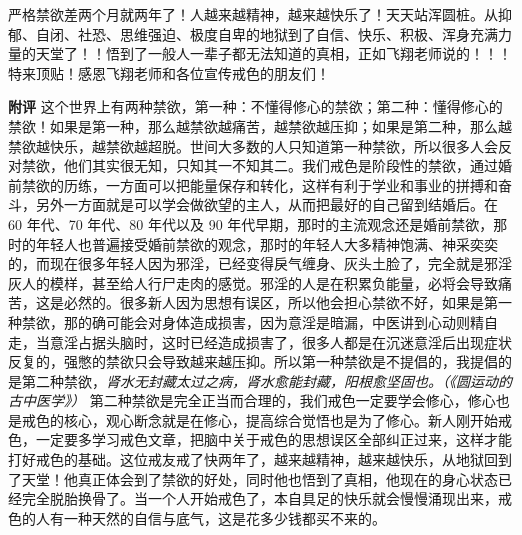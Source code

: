 \begin{case}
    严格禁欲差两个月就两年了！人越来越精神，越来越快乐了！天天站浑圆桩。从抑郁、自闭、社恐、思维强迫、极度自卑的地狱到了自信、快乐、积极、浑身充满力量的天堂了！！悟到了一般人一辈子都无法知道的真相，正如飞翔老师说的！！！特来顶贴！感恩飞翔老师和各位宣传戒色的朋友们！

    \textbf{附评} 这个世界上有两种禁欲，第一种：不懂得修心的禁欲；第二种：懂得修心的禁欲！如果是第一种，那么越禁欲越痛苦，越禁欲越压抑；如果是第二种，那么越禁欲越快乐，越禁欲越超脱。世间大多数的人只知道第一种禁欲，所以很多人会反对禁欲，他们其实很无知，只知其一不知其二。我们戒色是阶段性的禁欲，通过婚前禁欲的历练，一方面可以把能量保存和转化，这样有利于学业和事业的拼搏和奋斗，另外一方面就是可以学会做欲望的主人，从而把最好的自己留到结婚后。在 60 年代、70 年代、80 年代以及 90 年代早期，那时的主流观念还是婚前禁欲，那时的年轻人也普遍接受婚前禁欲的观念，那时的年轻人大多精神饱满、神采奕奕的，而现在很多年轻人因为邪淫，已经变得戾气缠身、灰头土脸了，完全就是邪淫灰人的模样，甚至给人行尸走肉的感觉。邪淫的人是在积累负能量，必将会导致痛苦，这是必然的。很多新人因为思想有误区，所以他会担心禁欲不好，如果是第一种禁欲，那的确可能会对身体造成损害，因为意淫是暗漏，中医讲到心动则精自走，当意淫占据头脑时，这时已经造成损害了，很多人都是在沉迷意淫后出现症状反复的，强憋的禁欲只会导致越来越压抑。所以第一种禁欲是不提倡的，我提倡的是第二种禁欲，\textit{肾水无封藏太过之病，肾水愈能封藏，阳根愈坚固也。（《圆运动的古中医学》）} 第二种禁欲是完全正当而合理的，我们戒色一定要学会修心，修心也是戒色的核心，观心断念就是在修心，提高综合觉悟也是为了修心。新人刚开始戒色，一定要多学习戒色文章，把脑中关于戒色的思想误区全部纠正过来，这样才能打好戒色的基础。这位戒友戒了快两年了，越来越精神，越来越快乐，从地狱回到了天堂！他真正体会到了禁欲的好处，同时他也悟到了真相，他现在的身心状态已经完全脱胎换骨了。当一个人开始戒色了，本自具足的快乐就会慢慢涌现出来，戒色的人有一种天然的自信与底气，这是花多少钱都买不来的。
\end{case}

